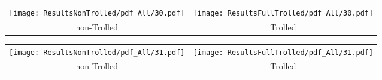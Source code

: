 \begin{tabular}{cc}
{  \texttt{[image: ResultsNonTrolled/pdf\_All/30.pdf]} } & 
{  \texttt{[image: ResultsFullTrolled/pdf\_All/30.pdf]}} \\
 non-Trolled & Trolled \\
\end{tabular}

\begin{tabular}{cc}
{  \texttt{[image: ResultsNonTrolled/pdf\_All/31.pdf]} } & 
{  \texttt{[image: ResultsFullTrolled/pdf\_All/31.pdf]}} \\
 non-Trolled & Trolled \\
\end{tabular}

